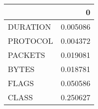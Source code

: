 \begin{tabular}{lr}
\toprule
{} &         0 \\
\midrule
DURATION &  0.005086 \\
PROTOCOL &  0.004372 \\
PACKETS  &  0.019081 \\
BYTES    &  0.018781 \\
FLAGS    &  0.050586 \\
CLASS    &  0.250627 \\
\bottomrule
\end{tabular}
